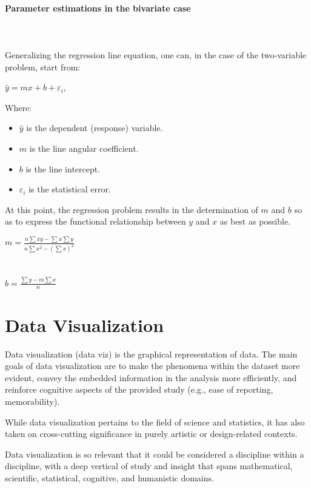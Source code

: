 \documentclass{article}
\begin{document}
\paragraph{Parameter estimations in the bivariate case}\mbox{} \\
\mbox{} \\
Generalizing the regression line equation, one can, in the case of the two-variable problem, start from:

$\hat{y} = mx + b +\varepsilon_{i}$,

Where:
\begin{itemize}
    \item $\hat{y}$ is the dependent (response) variable.
    \item $m$ is the line angular coefficient.
    \item $b$ is the line intercept.
    \item $\varepsilon_{i}$ is the statistical error.
\end{itemize}

At this point, the regression problem results in the determination of $m$ and $b$ so as to express the functional relationship between $y$ and $x$ as best as possible.

$\displaystyle m = \frac{n \sum{xy} - \sum{x}\sum{y}}{n\sum{x^2} - (\sum{x})^2}$ \\ \mbox{} \\
\mbox{} \\
$\displaystyle b = \frac{\sum{y} - m\sum{x}}{n}$

\clearpage
\section{Data Visualization}
Data visualization (data viz) is the graphical representation of data. 
The main goals of data visualization are to make the phenomena within the dataset more evident, convey the embedded information in the analysis more efficiently, and reinforce cognitive aspects of the provided study (e.g., ease of reporting, memorability).

While data visualization pertains to the field of science and statistics, it has also taken on cross-cutting significance in purely artistic or design-related contexts.

Data visualization  is so relevant that it could be considered a discipline within a discipline, with a deep vertical of study and insight that spans mathematical, scientific, statistical, cognitive, and humanistic domains. 
\end{document}
